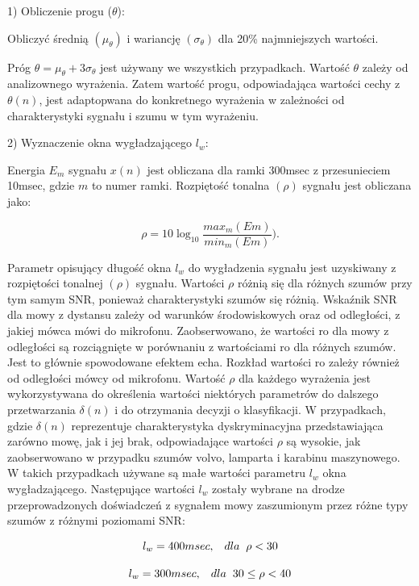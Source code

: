 \documentclass[eng,printmode]{mgr}
\begin{document}
  1) Obliczenie progu ($\theta$):
  
  Obliczyć średnią $(\mu_{\theta})$ i wariancję $(\sigma_{\theta})$ dla 20\% najmniejszych wartości.
  
  Próg $\theta = \mu_{\theta} + 3\sigma_{\theta}$ jest używany we wszystkich przypadkach. Wartość $\theta$ zależy od analizownego wyrażenia. Zatem wartość progu, odpowiadająca wartości cechy z $\theta(n)$, jest adaptopwana do konkretnego wyrażenia w zależności od charakterystyki sygnału i szumu w tym wyrażeniu.\vspace{5mm}
  
  2) Wyznaczenie okna wygładzającego $l_{w}$:
  
  Energia $E_{m}$ sygnału $x(n)$ jest obliczana dla ramki 300msec z przesunieciem 10msec, gdzie $m$ to numer ramki. Rozpiętość tonalna $(\rho)$ sygnału jest obliczana jako:
  
  $$\rho = 10\log_{10}\frac{max_m(Em)}{min_m(Em)}).$$
  
  
  Parametr opisujący długość okna $l_{w}$ do wygładzenia sygnału jest uzyskiwany z rozpiętości tonalnej $(\rho)$ sygnału.  Wartości $\rho$ różnią się dla różnych szumów przy tym samym SNR, ponieważ charakterystyki szumów się różnią. Wskaźnik SNR dla mowy z dystansu zależy od warunków środowiskowych oraz od odległości, z jakiej mówca mówi do mikrofonu.  Zaobserwowano, że wartości ro dla mowy z odległości są rozciągnięte w porównaniu z wartościami ro dla różnych szumów. Jest to głównie spowodowane efektem echa. Rozkład wartości ro zależy również od odległości mówcy od mikrofonu. Wartość $\rho$ dla każdego wyrażenia jest wykorzystywana do określenia wartości niektórych parametrów do dalszego przetwarzania $\delta(n)$ i do otrzymania decyzji o klasyfikacji. W przypadkach, gdzie $\delta(n)$ reprezentuje charakterystyka dyskryminacyjna przedstawiająca zarówno mowę, jak i jej brak, odpowiadające wartości $\rho$ są wysokie, jak zaobserwowano w przypadku szumów volvo, lamparta i karabinu maszynowego. W takich przypadkach używane są małe wartości parametru $l_{w}$ okna wygładzającego. Następujące wartości $l_{w}$ zostały wybrane na drodze przeprowadzonych doświadczeń z sygnałem mowy zaszumionym przez różne typy szumów z różnymi poziomami SNR:
  
  $$l_{w} = 400msec,\hspace{3mm}dla\hspace{2mm} \rho<30 $$
  
  $$l_{w} = 300msec,\hspace{3mm}dla\hspace{2mm} 30\leq\rho<40 $$
  
\end{document}
